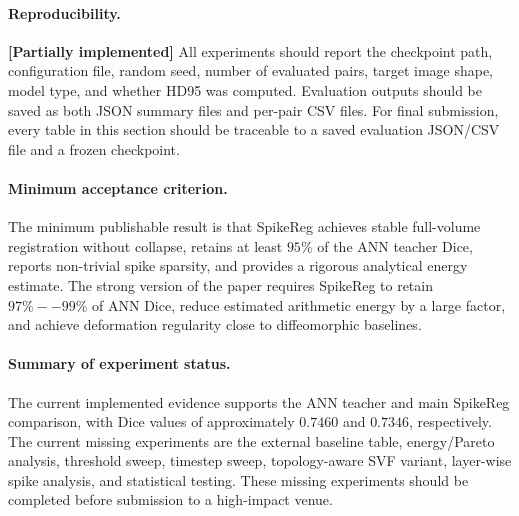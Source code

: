 \paragraph{Reproducibility.}
\textbf{[Partially implemented]} All experiments should report the checkpoint path, configuration file, random seed, number of evaluated pairs, target image shape, model type, and whether HD95 was computed. Evaluation outputs should be saved as both JSON summary files and per-pair CSV files. For final submission, every table in this section should be traceable to a saved evaluation JSON/CSV file and a frozen checkpoint.

\paragraph{Minimum acceptance criterion.}
The minimum publishable result is that SpikeReg achieves stable full-volume registration without collapse, retains at least \(95\%\) of the ANN teacher Dice, reports non-trivial spike sparsity, and provides a rigorous analytical energy estimate. The strong version of the paper requires SpikeReg to retain \(97\%--99\%\) of ANN Dice, reduce estimated arithmetic energy by a large factor, and achieve deformation regularity close to diffeomorphic baselines.

\paragraph{Summary of experiment status.}
The current implemented evidence supports the ANN teacher and main SpikeReg comparison, with Dice values of approximately \(0.7460\) and \(0.7346\), respectively. The current missing experiments are the external baseline table, energy/Pareto analysis, threshold sweep, timestep sweep, topology-aware SVF variant, layer-wise spike analysis, and statistical testing. These missing experiments should be completed before submission to a high-impact venue.